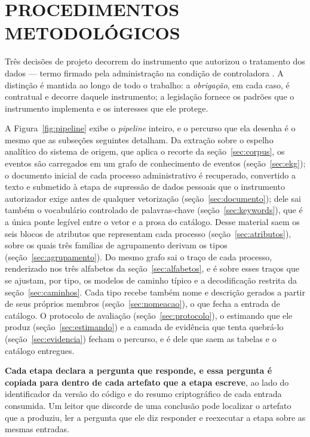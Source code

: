 \section{PROCEDIMENTOS METODOLÓGICOS}\label{sec:metodologia}

Três decisões de projeto decorrem do instrumento que autorizou o tratamento dos dados --- termo
firmado pela administração na condição de controladora \cite{seadpi2026termo}. A distinção é
mantida ao longo de todo o trabalho: a
\emph{obrigação}, em cada caso, é contratual e decorre daquele instrumento; a legislação fornece
os padrões que o instrumento implementa e os interesses que ele protege.

A Figura~\ref{fig:pipeline} exibe o \emph{pipeline} inteiro, e o percurso que ela desenha é o mesmo
que as subseções seguintes detalham. Da extração sobre o espelho analítico do sistema
de origem, que aplica o recorte da seção~\ref{sec:corpus}, os eventos são carregados em um grafo de
conhecimento de eventos (seção~\ref{sec:ekg}); o documento inicial de cada processo administrativo é
recuperado, convertido a texto e submetido à etapa de supressão de dados pessoais que o instrumento
autorizador exige antes de qualquer vetorização (seção~\ref{sec:documento}); dele sai também o
vocabulário controlado de palavras-chave (seção~\ref{sec:keywords}), que é a única ponte legível
entre o vetor e a prosa do catálogo. Desse material saem os seis blocos de atributos que representam
cada processo (seção~\ref{sec:atributos}), sobre os quais três famílias de agrupamento derivam os
tipos (seção~\ref{sec:agrupamento}). Do mesmo grafo sai o traço de cada processo,
renderizado nos três alfabetos da seção~\ref{sec:alfabetos}, e é sobre esses traços que se ajustam,
por tipo, os modelos de caminho típico e a decodificação restrita da seção~\ref{sec:caminhos}. Cada
tipo recebe também nome e descrição gerados a partir de seus próprios membros
(seção~\ref{sec:nomeacao}), o que fecha a entrada de catálogo. O
protocolo de avaliação (seção~\ref{sec:protocolo}), o estimando que ele produz
(seção~\ref{sec:estimando}) e a camada de evidência que tenta quebrá-lo
(seção~\ref{sec:evidencia}) fecham o percurso, e é dele que saem as tabelas e o catálogo entregues.

\textbf{Cada etapa declara a pergunta que responde, e essa pergunta é copiada para dentro de cada
artefato que a etapa escreve}, ao lado do
identificador da versão do código e do resumo criptográfico de cada entrada consumida. Um leitor
que discorde de uma conclusão pode localizar o artefato que a produziu, ler a pergunta que ele diz
responder e reexecutar a etapa sobre as mesmas entradas.

